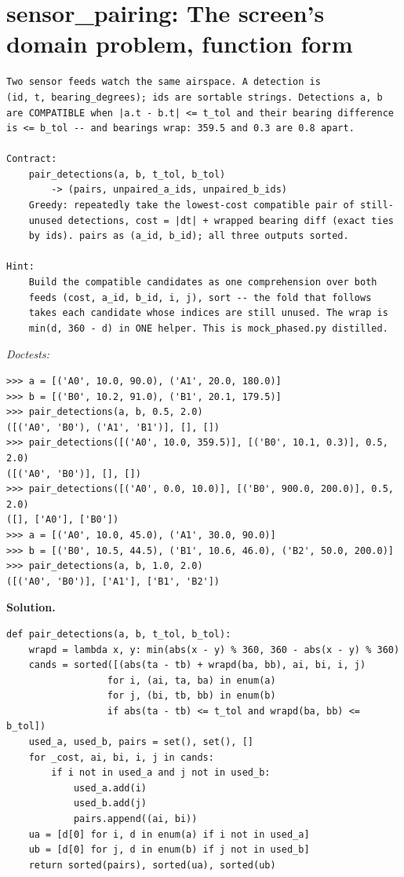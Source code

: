 \documentclass[11pt,letterpaper]{book}
\begin{document}
\section{sensor\_pairing: The screen's domain problem, function form}
\begin{lstlisting}[style=spec]
Two sensor feeds watch the same airspace. A detection is
(id, t, bearing_degrees); ids are sortable strings. Detections a, b
are COMPATIBLE when |a.t - b.t| <= t_tol and their bearing difference
is <= b_tol -- and bearings wrap: 359.5 and 0.3 are 0.8 apart.

Contract:
    pair_detections(a, b, t_tol, b_tol)
        -> (pairs, unpaired_a_ids, unpaired_b_ids)
    Greedy: repeatedly take the lowest-cost compatible pair of still-
    unused detections, cost = |dt| + wrapped bearing diff (exact ties
    by ids). pairs as (a_id, b_id); all three outputs sorted.

Hint:
    Build the compatible candidates as one comprehension over both
    feeds (cost, a_id, b_id, i, j), sort -- the fold that follows
    takes each candidate whose indices are still unused. The wrap is
    min(d, 360 - d) in ONE helper. This is mock_phased.py distilled.
\end{lstlisting}
\noindent\textit{Doctests:}
\begin{lstlisting}[style=spec]
>>> a = [('A0', 10.0, 90.0), ('A1', 20.0, 180.0)]
>>> b = [('B0', 10.2, 91.0), ('B1', 20.1, 179.5)]
>>> pair_detections(a, b, 0.5, 2.0)
([('A0', 'B0'), ('A1', 'B1')], [], [])
>>> pair_detections([('A0', 10.0, 359.5)], [('B0', 10.1, 0.3)], 0.5, 2.0)
([('A0', 'B0')], [], [])
>>> pair_detections([('A0', 0.0, 10.0)], [('B0', 900.0, 200.0)], 0.5, 2.0)
([], ['A0'], ['B0'])
>>> a = [('A0', 10.0, 45.0), ('A1', 30.0, 90.0)]
>>> b = [('B0', 10.5, 44.5), ('B1', 10.6, 46.0), ('B2', 50.0, 200.0)]
>>> pair_detections(a, b, 1.0, 2.0)
([('A0', 'B0')], ['A1'], ['B1', 'B2'])
\end{lstlisting}
\noindent\textbf{Solution.}
\begin{lstlisting}[style=code]
def pair_detections(a, b, t_tol, b_tol):
    wrapd = lambda x, y: min(abs(x - y) % 360, 360 - abs(x - y) % 360)
    cands = sorted([(abs(ta - tb) + wrapd(ba, bb), ai, bi, i, j)
                  for i, (ai, ta, ba) in enum(a)
                  for j, (bi, tb, bb) in enum(b)
                  if abs(ta - tb) <= t_tol and wrapd(ba, bb) <= b_tol])
    used_a, used_b, pairs = set(), set(), []
    for _cost, ai, bi, i, j in cands:
        if i not in used_a and j not in used_b:
            used_a.add(i)
            used_b.add(j)
            pairs.append((ai, bi))
    ua = [d[0] for i, d in enum(a) if i not in used_a]
    ub = [d[0] for j, d in enum(b) if j not in used_b]
    return sorted(pairs), sorted(ua), sorted(ub)
\end{lstlisting}
\end{document}

